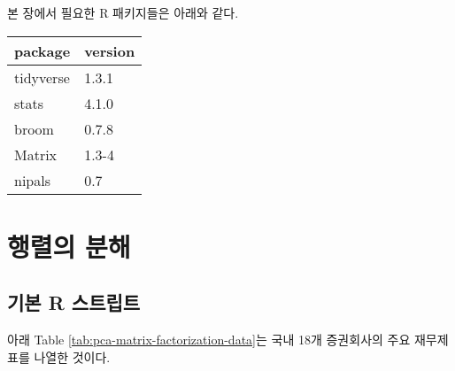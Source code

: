 \documentclass[
]{book}
\begin{document}
본 장에서 필요한 R 패키지들은 아래와 같다.

\begin{tabular}{l|l}
\hline
package & version\\
\hline
tidyverse & 1.3.1\\
\hline
stats & 4.1.0\\
\hline
broom & 0.7.8\\
\hline
Matrix & 1.3-4\\
\hline
nipals & 0.7\\
\hline
\end{tabular}

\hypertarget{pca-matrix-factorization}{%
\section{행렬의 분해}\label{pca-matrix-factorization}}

\hypertarget{pca-matrix-factorization-basic-script}{%
\subsection{기본 R 스트립트}\label{pca-matrix-factorization-basic-script}}

아래 Table \ref{tab:pca-matrix-factorization-data}는 국내 18개 증권회사의 주요 재무제표를 나열한 것이다.
\end{document}
